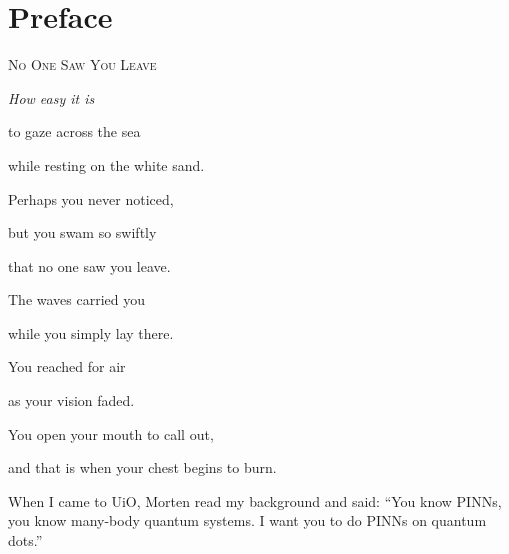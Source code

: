 

\begingroup
\let\clearpage\relax
\let\cleardoublepage\relax
\chapter*{Preface}
\endgroup
{}

\vspace{1.5em}
\begin{center}
\begin{minipage}{0.62\textwidth}
\centering
\textsc{No One Saw You Leave}\par\medskip
\itshape
How easy it is\par
to gaze across the sea\par
while resting on the white sand.\par\medskip
Perhaps you never noticed,\par
but you swam so swiftly\par
that no one saw you leave.\par\medskip
The waves carried you\par
while you simply lay there.\par
You reached for air\par
as your vision faded.\par\medskip
You open your mouth to call out,\par
and that is when your chest begins to burn.
\end{minipage}
\end{center}
\vspace{2em}

When I came to UiO, Morten read my background and said: ``You know PINNs, you know
many-body quantum systems. I want you to do PINNs on quantum dots.''



